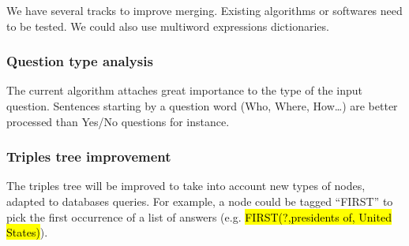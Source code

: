 We have several tracks to improve merging. Existing algorithms or softwares need to be tested. We could also use multiword expressions dictionaries.

\subsubsection{Question type analysis}

The current algorithm attaches great importance to the type of the input question. Sentences starting by a question word (Who, Where, How\dots) are better processed than Yes/No questions for instance.

\subsubsection{Triples tree improvement}

The triples tree will be improved to take into account new types of nodes, adapted to databases queries. For example, a node could be tagged ``FIRST'' to pick the first occurrence of a list of answers (e.g. \hl{FIRST(?,presidents of, United States)}).
